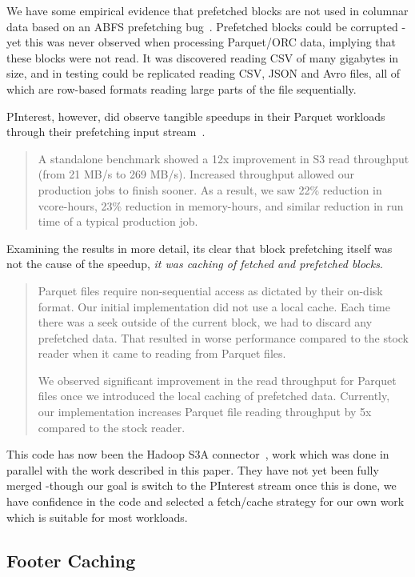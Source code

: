 \documentclass[manuscript]{acmart}
\begin{document}
We have some empirical evidence that prefetched blocks are not used
in columnar data based on an ABFS prefetching bug\ \cite{HADOOP-18521}.
Prefetched blocks could be corrupted -yet this was never observed when
processing Parquet/ORC data, implying that these blocks were not read.
It was discovered reading CSV of many gigabytes in size, and
in testing could be replicated reading CSV, JSON and Avro files,
all of which are row-based formats reading large parts of the file
sequentially.

PInterest, however, did observe tangible speedups in their Parquet workloads
through their prefetching input stream\ \cite{Bhalchandra:01}.

\begin{quotation}
 A standalone benchmark showed a 12x improvement in S3 read throughput
 (from 21 MB/s to 269 MB/s).
 Increased throughput allowed our production jobs to finish sooner.
 As a result, we saw 22\% reduction in vcore-hours, 23\% reduction in memory-hours,
 and similar reduction in run time of a typical production job.
\end{quotation}

Examining the results in more detail, its clear that block prefetching
itself was not the cause of the speedup, \emph{it was caching of fetched
and prefetched blocks}.

\begin{quotation}
Parquet files require non-sequential access as dictated by their on-disk format.
Our initial implementation did not use a local cache.
Each time there was a seek outside of the current block, we had to discard any prefetched data.
That resulted in worse performance compared to the stock reader when it came to reading from Parquet files.

We observed significant improvement in the read throughput for Parquet files once we
introduced the local caching of prefetched data.
Currently, our implementation increases Parquet file reading throughput by 5x compared to the stock
reader.
\end{quotation}

This code has now been the Hadoop S3A connector\ \cite{HADOOP-18028},
work which was done in parallel with the work described in this paper.
They have not yet been fully merged -though our goal is switch to the
PInterest stream once this is done, we have confidence in the code
and selected a fetch/cache strategy for our own work which is suitable
for most workloads.

\subsection{Footer Caching}
\end{document}
